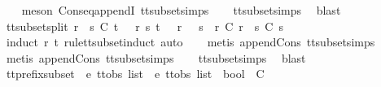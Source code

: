 \begin{isabellebody}
\ \ \isamarkupfalse%
\ {\isacharparenleft}meson\ Cons{\isacharunderscore}eq{\isacharunderscore}appendI\ tt{\isacharunderscore}subset{\isachardot}simps{\isacharparenleft}{}{\isacharparenright}{\isacharparenright}\isanewline
\ \ \isamarkupfalse%
\ tt{\isacharunderscore}subset{\isachardot}simps{\isacharparenleft}{}{\isacharparenright}\ \isamarkupfalse%
\ blast{\isacharplus}%
\endisatagproof
{\isafoldproof}%
%
\isadelimproof
\isanewline
%
\endisadelimproof
\isanewline
{}\isamarkupfalse%
\ tt{\isacharunderscore}subset{\isacharunderscore}split{}{\isacharcolon}\ {\isachardoublequoteopen}r\ {\isacharat}\ s\ {\isasymsubseteq}\isactrlsub C\ t\ {\isasymLongrightarrow}\ {\isasymexists}\ r{\isacharprime}\ s{\isacharprime}{\isachardot}\ t\ {\isacharequal}\ \ r{\isacharprime}\ {\isacharat}\ \ s{\isacharprime}\ {\isasymand}\ r\ {\isasymsubseteq}\isactrlsub C\ r{\isacharprime}\ {\isasymand}\ s\ {\isasymsubseteq}\isactrlsub C\ s{\isacharprime}{\isachardoublequoteclose}\isanewline
%
\isadelimproof
\ \ %
\endisadelimproof
%
\isatagproof
{}\isamarkupfalse%
\ {\isacharparenleft}induct\ r\ t\ rule{\isacharcolon}tt{\isacharunderscore}subset{\isachardot}induct{\isacharcomma}\ auto{\isacharparenright}\isanewline
\ \ \isamarkupfalse%
\ {\isacharparenleft}metis\ append{\isacharunderscore}Cons\ tt{\isacharunderscore}subset{\isachardot}simps{\isacharparenleft}{}{\isacharparenright}{\isacharparenright}\isanewline
\ \ \isamarkupfalse%
\ {\isacharparenleft}metis\ append{\isacharunderscore}Cons\ tt{\isacharunderscore}subset{\isachardot}simps{\isacharparenleft}{}{\isacharparenright}{\isacharparenright}\isanewline
\ \ \isamarkupfalse%
\ tt{\isacharunderscore}subset{\isachardot}simps{\isacharparenleft}{}{\isacharparenright}\ \isamarkupfalse%
\ blast{\isacharplus}%
\endisatagproof
{\isafoldproof}%
%
\isadelimproof
%
\endisadelimproof
%
\isadelimdocument
%
\endisadelimdocument
%
\isatagdocument
%
\isamarkuptrue%
%
\endisatagdocument
{\isafolddocument}%
%
\isadelimdocument
%
\endisadelimdocument
{}\isamarkupfalse%
\ tt{\isacharunderscore}prefix{\isacharunderscore}subset\ {\isacharcolon}{\isacharcolon}\ {\isachardoublequoteopen}{\isacharprime}e\ ttobs\ list\ {\isasymRightarrow}\ {\isacharprime}e\ ttobs\ list\ {\isasymRightarrow}\ bool{\isachardoublequoteclose}\ {\isacharparenleft}\ {\isachardoublequoteopen}{\isasymlesssim}\isactrlsub C{\isachardoublequoteclose}\ {}{}{\isacharparenright}\ \isanewline

\end{isabellebody}
